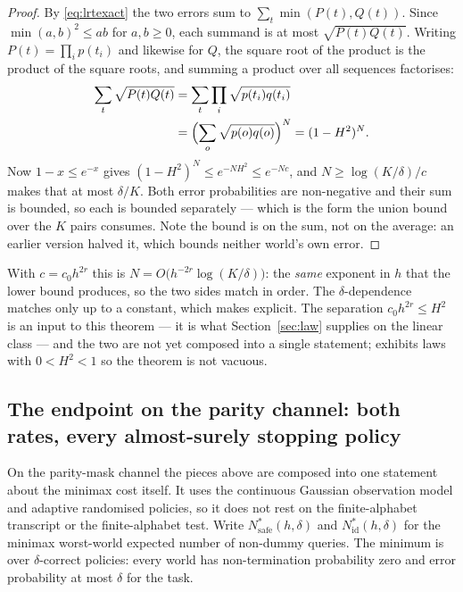 \begin{proof}
By \eqref{eq:lrtexact} the two errors sum to $\sum_{t}\min(P(t),Q(t))$. Since
$\min(a,b)^{2}\le ab$ for $a,b\ge0$, each summand is at most $\sqrt{P(t)Q(t)}$. Writing
$P(t)=\prod_{i}p(t_{i})$ and likewise for $Q$, the square root of the product is the
product of the square roots, and summing a product over all sequences factorises:
\begin{align*}
\sum_{t}\sqrt{P(t)Q(t)}
&=\sum_{t}\prod_{i}\sqrt{p(t_{i})q(t_{i})}\\
&=\Bigl(\sum_{o}\sqrt{p(o)q(o)}\Bigr)^{N}
=(1-H^{2})^{N}.
\end{align*}
Now $1-x\le e^{-x}$ gives $(1-H^{2})^{N}\le e^{-NH^{2}}\le e^{-Nc}$, and
$N\ge\log(K/\delta)/c$ makes that at most $\delta/K$. Both error probabilities are
non-negative and their sum is bounded, so each is bounded separately --- which is the form
the union bound over the $K$ pairs consumes. Note the bound is on the sum, not on the
average: an earlier version halved it, which bounds neither world's own error.
\end{proof}

With $c=c_{0}h^{2r}$ this is $N=O\bigl(h^{-2r}\log(K/\delta)\bigr)$: the \emph{same}
exponent in $h$ that the lower bound produces, so the two sides match in order. The
$\delta$-dependence matches only up to a constant, which  makes
explicit. The separation $c_{0}h^{2r}\le H^{2}$ is an input to this theorem --- it is what
Section~\ref{sec:law} supplies on the linear class --- and the two are not yet composed
into a single statement;  exhibits laws with $0<H^{2}<1$ so
the theorem is not vacuous.


\subsection{The endpoint on the parity channel: both rates, every almost-surely stopping policy}
\label{sec:endpoint}

On the parity-mask channel the pieces above are composed into one statement about the
minimax cost itself. It uses the continuous Gaussian observation model and adaptive
randomised policies, so it does not rest on the finite-alphabet transcript or the
finite-alphabet test. Write $N^{*}_{\mathrm{safe}}(h,\delta)$ and $N^{*}_{\mathrm{id}}(h,\delta)$
for the minimax worst-world expected number of non-dummy queries. The minimum is over
$\delta$-correct policies: every world has non-termination probability zero and error
probability at most $\delta$ for the task.


